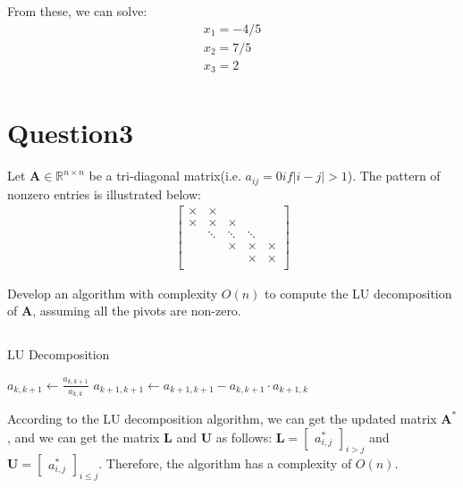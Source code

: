 \documentclass{article}
\newcommand{\R}{\mathbb{R}}
\begin{document}
From these, we can solve:
\begin{align*}
    x_1 = -4/5\\
    x_2 = 7/5\\
    x_3 = 2 \\
\end{align*}

\section*{Question3}
Let \(\bm{A} \in \R^{n \times n}\) be a tri-diagonal matrix(i.e. \(a_{ij} = 0 if |i - j| > 1\)). The pattern of nonzero entries is illustrated below:
\begin{align*}
    \begin{bmatrix}
        \times & \times & & & \\
        \times & \times & \times & & \\
        & \ddots & \ddots & \ddots & \\
        & &  \times & \times &\times \\
        & & & \times & \times \\
    \end{bmatrix}
\end{align*}

\noindent 
Develop an algorithm with complexity \(\textit{O}(n)\) to compute the LU decomposition of \(\bm{A}\), assuming all the pivots are non-zero.

\subsection*{ }

\begin{algorithm}
    \caption{LU Decomposition}
    \begin{algorithmic}[1]
            \State $a_{k,k+1} \gets \frac{a_{k,k+1}}{a_{k,k}}$
            \State $a_{k+1,k+1} \gets a_{k+1,k+1} - a_{k,k+1} \cdot a_{k+1,k}$
        \EndFor
    \end{algorithmic}
\end{algorithm}

According to the LU decomposition algorithm, we can get the updated matrix \(\bm{A^*}\), and we can get the matrix \(\bm{L}\) and \(\bm{U}\) as follows:
\(\bm{L} = \begin{bmatrix}
    a_{i, j}^*
\end{bmatrix}_{i > j}\) and \(\bm{U} = \begin{bmatrix}
    a_{i, j}^*
\end{bmatrix}_{i \leq j}\). Therefore, the algorithm has a complexity of \(O(n)\).
\end{document}
